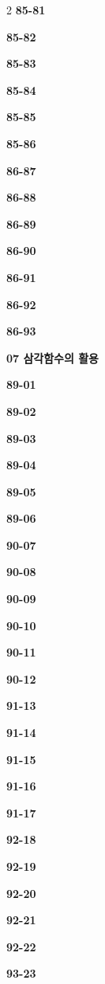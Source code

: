 \documentclass[10pt,a4paper]{article}
\begin{document}
\begin{multicols}{2}
\noindent\textbf{85-81}\ \par
\noindent\textbf{85-82}\ \par
\noindent\textbf{85-83}\ \par
\noindent\textbf{85-84}\ \par
\noindent\textbf{85-85}\ \par
\noindent\textbf{85-86}\ \par
\noindent\textbf{86-87}\ \par
\noindent\textbf{86-88}\ \par
\noindent\textbf{86-89}\ \par
\noindent\textbf{86-90}\ \par
\noindent\textbf{86-91}\ \par
\noindent\textbf{86-92}\ \par
\noindent\textbf{86-93}\ \par
\noindent\textbf{07 삼각함수의 활용}\par\smallskip
\noindent\textbf{89-01}\ \par
\noindent\textbf{89-02}\ \par
\noindent\textbf{89-03}\ \par
\noindent\textbf{89-04}\ \par
\noindent\textbf{89-05}\ \par
\noindent\textbf{89-06}\ \par
\noindent\textbf{90-07}\ \par
\noindent\textbf{90-08}\ \par
\noindent\textbf{90-09}\ \par
\noindent\textbf{90-10}\ \par
\noindent\textbf{90-11}\ \par
\noindent\textbf{90-12}\ \par
\noindent\textbf{91-13}\ \par
\noindent\textbf{91-14}\ \par
\noindent\textbf{91-15}\ \par
\noindent\textbf{91-16}\ \par
\noindent\textbf{91-17}\ \par
\noindent\textbf{92-18}\ \par
\noindent\textbf{92-19}\ \par
\noindent\textbf{92-20}\ \par
\noindent\textbf{92-21}\ \par
\noindent\textbf{92-22}\ \par
\noindent\textbf{93-23}\ \par

\end{multicols}
\end{document}
